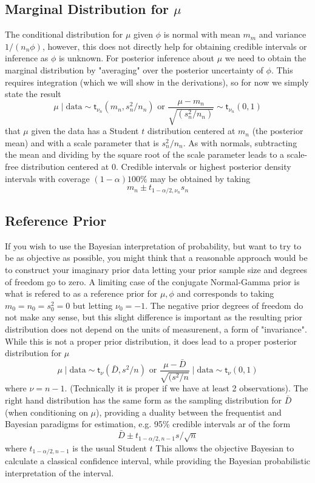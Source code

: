 \documentclass[11pt]{article}
\newcommand{\St}{\textsf{t}}
\def\data{\text{data}}
\begin{document}
\subsection*{Marginal Distribution for $\mu$}
The conditional distribution for $\mu$ given $\phi$ is normal with mean $m_m$ and
variance $1/(n_n \phi)$, however, this does not directly help for obtaining credible intervals or inference as $\phi$ is unknown.
For posterior inference about $\mu$ we need to obtain the marginal distribution by
"averaging"  over the posterior uncertainty of $\phi$.  This requires integration (which we will show in the derivations), so for now we simply state the  result 
$$
\mu \mid \data  \sim \St_{\nu_n}(m_n, s^2_n/n_n)  \text{ or }  \frac{\mu - m_n}{\sqrt{(s^2_n/n_n)}} \sim \St_{\nu_n}(0,1)
$$
that $\mu$ given the data has a Student $t$ distribution centered at  $m_n$ (the posterior mean) and with a scale parameter that is $s^2_n/n_n$.   As with normals, subtracting the mean and dividing by the square root of the scale parameter leads to a scale-free distribution centered at 0.  Credible intervals or highest posterior density intervals with coverage $(1 - \alpha) 100\%$ may be obtained by taking 
$$m_n \pm t_{1 - \alpha/2, \nu_n} s_n$$



\subsection*{Reference Prior}

If you wish to use the Bayesian interpretation of probability, but want to try to be as objective as possible, you might think that a reasonable approach would be to construct your imaginary prior data letting your prior sample size and degrees of freedom go to zero.  A limiting case of the conjugate Normal-Gamma prior is what is refered to as a reference prior for $\mu, \phi$ and corresponds to taking $m_0 = n_0 = s^2_0 = 0$ but letting $\nu_0 = -1$.   
The negative prior degrees of freedom do not make any sense,  but this slight difference is important as the resulting  prior distribution does not depend on the units of measurenent, a form of "invariance".   While this is not a proper prior distribution, it does lead to 
a proper posterior distribution for $\mu$ 
$$
\mu \mid \data  \sim \St_{\nu}(\bar{D}, s^2/n)  \text{ or }  \frac{\mu - \bar{D}}{\sqrt{(s^2/n}}  \mid \data \sim \St_{\nu}(0,1)
$$
where $\nu = n - 1$.  (Technically it is proper if we have at least 2 observations).
The right hand distribution has the same form as the sampling distribution  for $\bar{D}$ (when conditioning on $\mu$), providing a duality between the frequentist and Bayesian paradigms for estimation, e.g.  95\% credible intervals ar of the form
$$\bar{D} \pm t_{1 - \alpha/2, n - 1} s/\sqrt{n}$$
where  $t_{1 - \alpha/2, n - 1}$  is the usual Student $t$
This allows the objective Bayesian to calculate a classical 
confidence interval, while providing the Bayesian probabilistic interpretation of the interval.
\end{document}
